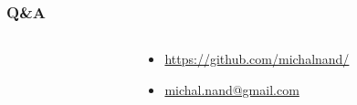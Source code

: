 \documentclass{beamer}
\begin{document}
\begin{frame}
  
  \frametitle{Q\&A}

  \begin{columns}

    \begin{column}{0.5\textwidth}
    \end{column}

    \begin{column}{0.5\textwidth}
      \begin{itemize}
        \item \url{https://github.com/michalnand/}
        \item \url{michal.nand@gmail.com}
      \end{itemize}
    \end{column}

  \end{columns}

    
\end{frame}
\end{document}
